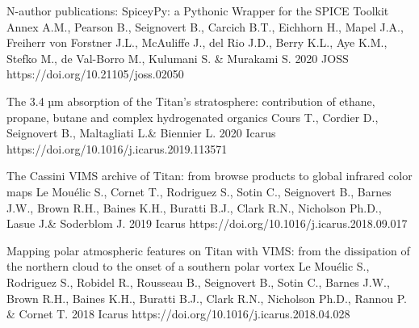 \begin{cvpublications}{N-author publications:}
	{SpiceyPy: a Pythonic Wrapper for the SPICE Toolkit}
	{Annex A.M., Pearson B., Seignovert B., Carcich B.T., Eichhorn H., Mapel J.A., Freiherr von Forstner J.L., McAuliffe J., del Rio J.D., Berry K.L., Aye K.M., Stefko M., de Val-Borro M., Kulumani S. \& Murakami S.}
	{2020}
    {JOSS}
    {https://doi.org/10.21105/joss.02050}

	{The 3.4 µm absorption of the Titan's stratosphere: contribution of ethane, propane, butane and complex hydrogenated organics}
	{Cours T., Cordier D., Seignovert B., Maltagliati L.\& Biennier L.}
	{2020}
    {Icarus}
    {https://doi.org/10.1016/j.icarus.2019.113571}

    {The Cassini VIMS archive of Titan: from browse products to global infrared color maps}
	{Le Mouélic S., Cornet T., Rodriguez S., Sotin C., Seignovert B., Barnes J.W., Brown R.H., Baines K.H., Buratti B.J., Clark R.N., Nicholson Ph.D., Lasue J.\& Soderblom J.}
	{2019}
    {Icarus}
    {https://doi.org/10.1016/j.icarus.2018.09.017}

    {Mapping polar atmospheric features on Titan with VIMS: from the dissipation of the northern cloud to the onset of a southern polar vortex}
	{Le Mouélic S., Rodriguez S., Robidel R., Rousseau B., Seignovert B., Sotin C., Barnes J.W., Brown R.H., Baines K.H., Buratti B.J., Clark R.N., Nicholson Ph.D., Rannou P. \& Cornet T.}
	{2018}
    {Icarus}
    {https://doi.org/10.1016/j.icarus.2018.04.028}


\end{cvpublications}
